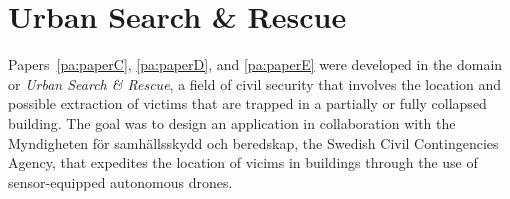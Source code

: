 







\section{Urban Search \& Rescue} \label{contributions:usar}
Papers~\ref{pa:paperC}, \ref{pa:paperD}, and \ref{pa:paperE} were developed in the domain or \emph{Urban Search \& Rescue}, a field of civil security that involves the location and possible extraction of victims that are trapped in a partially or fully collapsed building.  The goal was to design an application in collaboration with the Myndigheten f\"or samh\"allsskydd och beredskap, the Swedish Civil Contingencies Agency, that expedites the location of vicims in buildings through the use of sensor-equipped autonomous drones.


